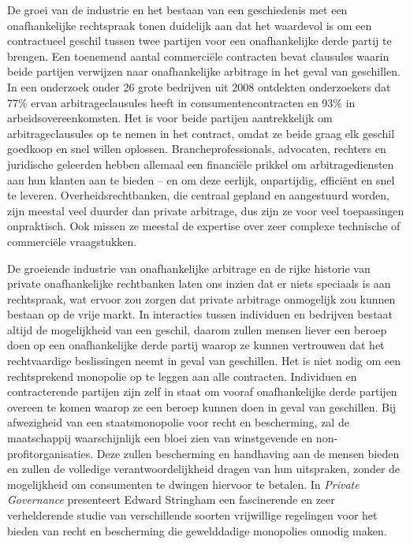 De groei van de industrie en het bestaan van een geschiedenis met een onafhankelijke rechtspraak tonen duidelijk aan dat het waardevol is om een contractueel geschil tussen twee partijen voor een onafhankelijke derde partij te brengen. Een toenemend aantal commerciële contracten bevat clausules waarin beide partijen verwijzen naar onafhankelijke arbitrage in het geval van geschillen. In een onderzoek onder 26 grote bedrijven uit 2008 ontdekten onderzoekers dat 77\% ervan arbitrageclausules heeft in consumentencontracten en 93\% in arbeidsovereenkomsten.\autocite{201} Het is voor beide partijen aantrekkelijk om arbitrageclausules op te nemen in het contract, omdat ze beide graag elk geschil goedkoop en snel willen oplossen. Brancheprofessionals, advocaten, rechters en juridische geleerden hebben allemaal een financiële prikkel om arbitragediensten aan hun klanten aan te bieden -- en om deze eerlijk, onpartijdig, efficiënt en snel te leveren. Overheidsrechtbanken, die centraal gepland en aangestuurd worden, zijn meestal veel duurder dan private arbitrage, dus zijn ze voor veel toepassingen onpraktisch. Ook missen ze meestal de expertise over zeer complexe technische of commerciële vraagstukken.\autocite{202}

De groeiende industrie van onafhankelijke arbitrage en de rijke historie van private onafhankelijke rechtbanken laten ons inzien dat er niets speciaals is aan rechtspraak, wat ervoor zou zorgen dat private arbitrage onmogelijk zou kunnen bestaan op de vrije markt. In interacties tussen individuen en bedrijven bestaat altijd de mogelijkheid van een geschil, daarom zullen mensen liever een beroep doen op een onafhankelijke derde partij waarop ze kunnen vertrouwen dat het rechtvaardige beslissingen neemt in geval van geschillen. Het is niet nodig om een rechtsprekend monopolie op te leggen aan alle contracten. Individuen en contracterende partijen zijn zelf in staat om vooraf onafhankelijke derde partijen overeen te komen waarop ze een beroep kunnen doen in geval van geschillen. Bij afwezigheid van een staatsmonopolie voor recht en bescherming, zal de maatschappij waarschijnlijk een bloei zien van winstgevende en non-profitorganisaties. Deze zullen bescherming en handhaving aan de mensen bieden en zullen de volledige verantwoordelijkheid dragen van hun uitspraken, zonder de mogelijkheid om consumenten te dwingen hiervoor te betalen. In \emph{Private Governance} presenteert Edward Stringham een fascinerende en zeer verhelderende studie van verschillende soorten vrijwillige regelingen voor het bieden van recht en bescherming die gewelddadige monopolies onnodig maken.

